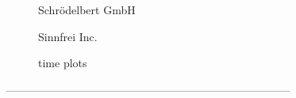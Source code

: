 \documentclass{beamer}
\begin{document}
\begin{figure}[h]
\centering
\caption{Schrödelbert GmbH}
\end{figure}

\begin{figure}[h]
\centering
\caption{Sinnfrei Inc.}
\end{figure}


\begin{figure}
	\centering
\caption{time plots} 
\end{figure} 

-----------------------------------------------------------------------------
\end{document}
